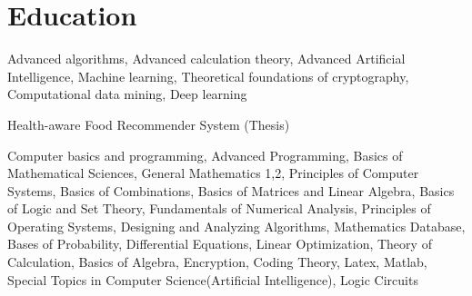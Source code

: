 \documentclass[a4paper]{deedy-resume} %
\begin{document}
\hfill
%
%
\begin{minipage}[t]{0.66\textwidth} %



\section{Education}


\vspace{\topsep} %
\begin{tightitemize}
\item Advanced algorithms, Advanced calculation theory, Advanced Artificial Intelligence, Machine learning, Theoretical foundations of cryptography, Computational data mining, Deep learning
\item Health-aware Food Recommender System (Thesis)
\end{tightitemize}

\sectionspace %

\begin{tightitemize}
\item Computer basics and programming, Advanced Programming, Basics of Mathematical Sciences, General Mathematics 1,2, Principles of Computer Systems, Basics of Combinations,  Basics of Matrices and Linear Algebra, Basics of Logic and Set Theory, Fundamentals of Numerical Analysis, Principles of Operating Systems, Designing and Analyzing Algorithms, Mathematics Database, Bases of Probability, Differential Equations, Linear Optimization, Theory of Calculation, Basics of Algebra,  Encryption, Coding Theory, Latex, Matlab, Special Topics in Computer Science(Artificial Intelligence), Logic Circuits
\end{tightitemize}
\sectionspace %


\end{minipage}
\end{document}
